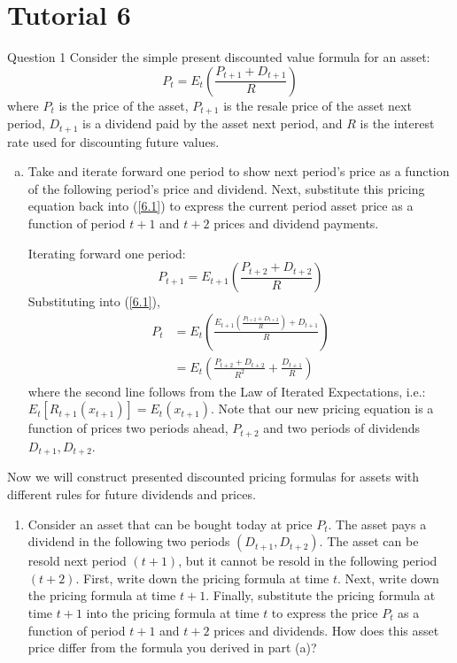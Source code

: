 \documentclass[a4paper]{article}
\newif\IfInSansMode
\begin{document}
\section{Tutorial 6}
	\begin{questionbox}{Question 1}
		Consider the simple present discounted value formula for an asset:
		\begin{equation}
			P_t = E_t \left( \frac{P_{t+1} + D_{t+1}}{R} \right) \label{6.1}
		\end{equation}
		where \( P_t \) is the price of the asset, \( P_{t+1} \) is the resale price of the asset next period, \( D_{t+1} \) is a dividend paid by the asset next period, and \( R \) is the interest rate used for discounting future values.
		\begin{enumerate}[(a)]
			\item Take  and iterate forward one period to show next period's price as a function of the following period's price and dividend. Next, substitute this pricing equation back into (\ref{6.1}) to express the current period asset price as a function of period \( t+1 \) and \( t+2 \) prices and dividend payments.
			\begin{explanationbox}
				Iterating forward one period:
				\[
					P_{t+1} = E_{t+1} \left( \frac{P_{t+2} + D_{t+2}}{R} \right)
				\]
				Substituting into (\ref{6.1}),
				\begin{align*}
					P_t &= E_t \left( \frac{E_{t+1} \left( \frac{P_{t+2} + D_{t+2}}{R} \right) + D_{t+1}}{R} \right)\\
					&=E_t \left( \frac{P_{t+2} + D_{t+2}}{R^2} + \frac{D_{t+1}}{R} \right)
				\end{align*}
				where the second line follows from the Law of Iterated Expectations, i.e.: \( E_t[R_{t+1}(x_{t+1})] = E_t(x_{t+1}) \). Note that our new pricing equation is a function of prices two periods ahead, \( P_{t+2} \) and two periods of dividends \( D_{t+1},D_{t+2} \).
			\end{explanationbox}
		\end{enumerate}
		Now we will construct presented discounted pricing formulas for assets with diﬀerent rules for future dividends and prices.
		\begin{enumerate}[resume*]
			\item Consider an asset that can be bought today at price \( P_t \). The asset pays a dividend in the following two periods \( (D_{t+1},D_{t+2}) \). The asset can be resold next period \( (t+1) \), but it cannot be resold in the following period \( (t+2) \). First, write down the pricing formula at time \( t \). Next, write down the pricing formula at time \( t+1 \). Finally, substitute the pricing formula at time \( t+1 \) into the pricing formula at time \( t \) to express the price \( P_t \) as a function of period \( t+1 \) and \( t+2 \) prices and dividends. How does this asset price differ from the formula you derived in part (a)?

\end{enumerate}
\end{questionbox}
\end{document}
